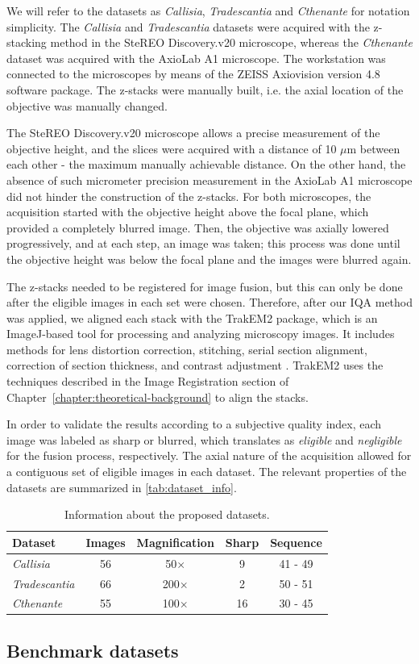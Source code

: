 We will refer to the datasets as \textit{Callisia}, \textit{Tradescantia} and \textit{Cthenante} for notation simplicity. The \textit{Callisia} and \textit{Tradescantia} datasets were acquired with the z-stacking method in the SteREO Discovery.v20 microscope, whereas the \textit{Cthenante} dataset was acquired with the AxioLab A1 microscope. The workstation was connected to the microscopes by means of the ZEISS Axiovision version 4.8 software package. The z-stacks were manually built, i.e. the axial location of the objective was manually changed.

The SteREO Discovery.v20 microscope allows a precise measurement of the objective height, and the slices were acquired with a distance of 10 $\mu$m between each other - the maximum manually achievable distance. On the other hand, the absence of such micrometer precision measurement in the AxioLab A1 microscope did not hinder the construction of the z-stacks. For both microscopes, the acquisition started with the objective height above the focal plane, which provided a completely blurred image. Then, the objective was axially lowered progressively, and at each step, an image was taken; this process was done until the objective height was below the focal plane and the images were blurred again.

The z-stacks needed to be registered for image fusion, but this can only be done after the eligible images in each set were chosen. Therefore, after our IQA method was applied, we aligned each stack with the TrakEM2 package, which is an ImageJ-based tool for processing and analyzing microscopy images. It includes methods for lens distortion correction, stitching, serial section alignment, correction of section thickness, and contrast adjustment \cite{saalfeld2019computational}. TrakEM2 uses the techniques described in the Image Registration section of Chapter~\ref{chapter:theoretical-background} to align the stacks.

In order to validate the results according to a subjective quality index, each image was labeled as sharp or blurred, which translates as \emph{eligible} and \emph{negligible} for the fusion process, respectively. The axial nature of the acquisition allowed for a contiguous set of eligible images in each dataset. The relevant properties of the datasets are summarized in \autoref{tab:dataset_info}. 

\begin{table}[ht]
    \centering
    \caption{Information about the proposed datasets.}
    \label{tab:dataset_info}
    \begin{tabular}{lcccc}
        \toprule
        \textbf{Dataset} & \textbf{Images} & \textbf{Magnification} & \textbf{Sharp} & \textbf{Sequence}\\
        \midrule
        \textit{Callisia} & 56 & 50$\times$ & 9 & 41 - 49\\
        \textit{Tradescantia} & 66 & 200$\times$ & 2 & 50 - 51\\
        \textit{Cthenante} & 55 & 100$\times$ & 16 & 30 - 45\\
        \bottomrule
    \end{tabular}
    \centering
    \fautor
\end{table}

\subsection{Benchmark datasets}

\cite{hosu2020koniq}

\cite{larson2010most}